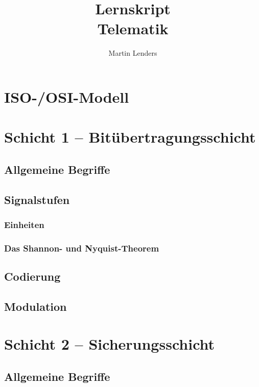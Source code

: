 \documentclass[a4paper,10pt]{scrartcl}
\title{Lernskript\\\LARGE{}Telematik}
\author{Martin Lenders}
\begin{document}
\maketitle
\tableofcontents
\section{ISO-/OSI-Modell}

\section{Schicht 1 -- Bitübertragungsschicht}
\subsection{Allgemeine Begriffe}
\subsection{Signalstufen}
\subsubsection{Einheiten}
\subsubsection{Das Shannon- und Nyquist-Theorem}
\subsection{Codierung}
\subsection{Modulation}

\section{Schicht 2 -- Sicherungsschicht}
\subsection{Allgemeine Begriffe}
\end{document}
